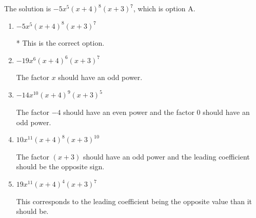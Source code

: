 \documentclass{extbook}[14pt]
\begin{document}
\begin{enumerate}
{The solution is \( -5x^{5} (x + 4)^{8} (x + 3)^{7} \), which is option A.\begin{enumerate}[label=\Alph*.]
\item \( -5x^{5} (x + 4)^{8} (x + 3)^{7} \)

* This is the correct option.
\item \( -19x^{6} (x + 4)^{6} (x + 3)^{7} \)

The factor $x$ should have an odd power.
\item \( -14x^{10} (x + 4)^{9} (x + 3)^{5} \)

The factor $-4$ should have an even power and the factor $0$ should have an odd power.
\item \( 10x^{11} (x + 4)^{8} (x + 3)^{10} \)

The factor $(x + 3)$ should have an odd power and the leading coefficient should be the opposite sign.
\item \( 19x^{11} (x + 4)^{4} (x + 3)^{7} \)

This corresponds to the leading coefficient being the opposite value than it should be.
\end{enumerate}

}
\end{enumerate}
\end{document}
